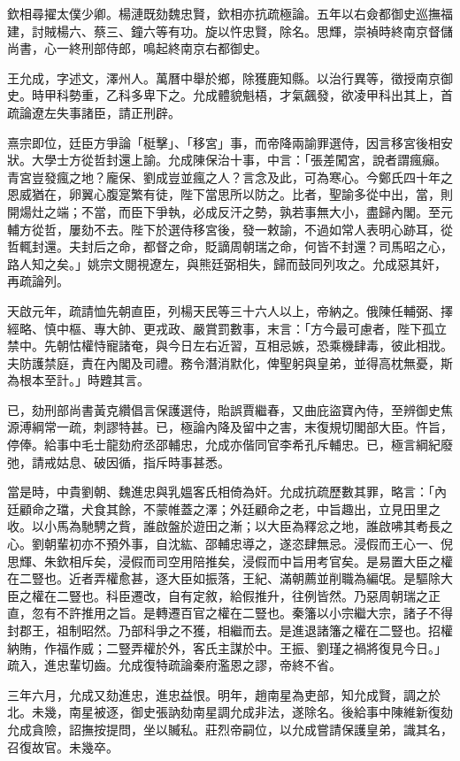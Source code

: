 \begin{pinyinscope}
欽相尋擢太僕少卿。楊漣既劾魏忠賢，欽相亦抗疏極論。五年以右僉都御史巡撫福建，討賊楊六、蔡三、鐘六等有功。旋以忤忠賢，除名。思輝，崇禎時終南京督儲尚書，心一終刑部侍郎，鳴起終南京右都御史。

王允成，字述文，澤州人。萬曆中舉於鄉，除獲鹿知縣。以治行異等，徵授南京御史。時甲科勢重，乙科多卑下之。允成體貌魁梧，才氣飆發，欲凌甲科出其上，首疏論遼左失事諸臣，請正刑辟。

熹宗即位，廷臣方爭論「梃擊」、「移宮」事，而帝降兩諭罪選侍，因言移宮後相安狀。大學士方從哲封還上諭。允成陳保治十事，中言：「張差闖宮，說者謂瘋癲。青宮豈發瘋之地？龐保、劉成豈並瘋之人？言念及此，可為寒心。今鄭氏四十年之恩威猶在，卵翼心腹寔繁有徒，陛下當思所以防之。比者，聖諭多從中出，當，則開煬灶之端；不當，而臣下爭執，必成反汗之勢，孰若事無大小，盡歸內閣。至元輔方從哲，屢劾不去。陛下於選侍移宮後，發一敕諭，不過如常人表明心跡耳，從哲輒封還。夫封后之命，都督之命，貶謫周朝瑞之命，何皆不封還？司馬昭之心，路人知之矣。」姚宗文閱視遼左，與熊廷弼相失，歸而鼓同列攻之。允成惡其奸，再疏論列。

天啟元年，疏請恤先朝直臣，列楊天民等三十六人以上，帝納之。俄陳任輔弼、擇經略、慎中樞、專大帥、更戎政、嚴賞罰數事，末言：「方今最可慮者，陛下孤立禁中。先朝怙權恃寵諸奄，與今日左右近習，互相忌嫉，恐乘機肆毒，彼此相戕。夫防護禁庭，責在內閣及司禮。務令潛消默化，俾聖躬與皇弟，並得高枕無憂，斯為根本至計。」時韙其言。

已，劾刑部尚書黃克纘倡言保護選侍，貽誤賈繼春，又曲庇盜寶內侍，至辨御史焦源溥綱常一疏，刺謬特甚。已，極論內降及留中之害，末復規切閣部大臣。忤旨，停俸。給事中毛士龍劾府丞邵輔忠，允成亦偕同官李希孔斥輔忠。已，極言綱紀廢弛，請戒姑息、破因循，指斥時事甚悉。

當是時，中貴劉朝、魏進忠與乳媼客氏相倚為奸。允成抗疏歷數其罪，略言：「內廷顧命之璫，犬食其餘，不蒙帷蓋之澤；外廷顧命之老，中旨趣出，立見田里之收。以小馬為馳騁之貲，誰啟盤於遊田之漸；以大臣為釋忿之地，誰啟咈其耇長之心。劉朝輩初亦不預外事，自沈紘、邵輔忠導之，遂恣肆無忌。浸假而王心一、倪思輝、朱欽相斥矣，浸假而司空用陪推矣，浸假而中旨用考官矣。是易置大臣之權在二豎也。近者弄權愈甚，逐大臣如振落，王紀、滿朝薦並削職為編氓。是驅除大臣之權在二豎也。科臣遷改，自有定敘，給假推升，往例皆然。乃惡周朝瑞之正直，忽有不許推用之旨。是轉遷百官之權在二豎也。秦籓以小宗繼大宗，諸子不得封郡王，祖制昭然。乃部科爭之不獲，相繼而去。是進退諸籓之權在二豎也。招權納賄，作福作威；二豎弄權於外，客氏主謀於中。王振、劉瑾之禍將復見今日。」疏入，進忠輩切齒。允成復特疏論秦府濫恩之謬，帝終不省。

三年六月，允成又劾進忠，進忠益恨。明年，趙南星為吏部，知允成賢，調之於北。未幾，南星被逐，御史張訥劾南星調允成非法，遂除名。後給事中陳維新復劾允成貪險，詔撫按提問，坐以贓私。莊烈帝嗣位，以允成嘗請保護皇弟，識其名，召復故官。未幾卒。


\end{pinyinscope}

